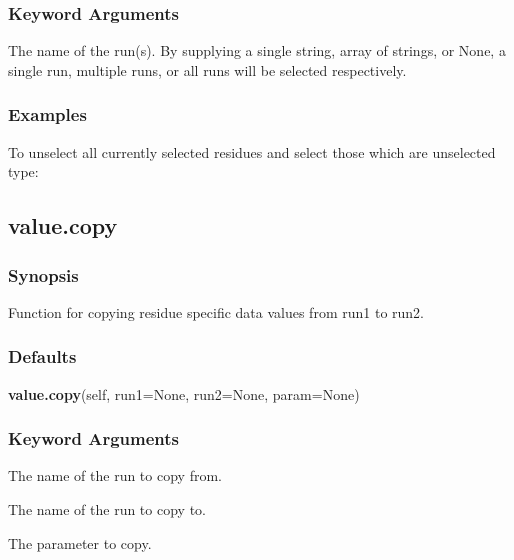  \subsubsection{Keyword Arguments} 

   The name of the run(s).  By supplying a single string, array of strings, or None, a single run, multiple runs, or all runs will be selected respectively.  

  

  
 \subsubsection{Examples} 

 To unselect all currently selected residues and select those which are unselected type: 
  


  

 \newpage 

 \subsection{value.copy} 

  
 \subsubsection{Synopsis} 

 Function for copying residue specific data values from run1 to run2. 
  

  
 \subsubsection{Defaults} 

 \textsf{\textbf{value.copy}(self, run1=None, run2=None, param=None)} 

  
 \subsubsection{Keyword Arguments} 

   The name of the run to copy from.   

   The name of the run to copy to.   

   The parameter to copy.  

  

